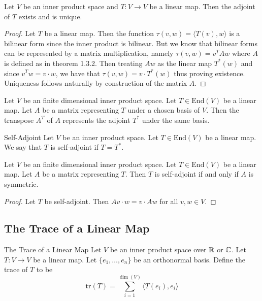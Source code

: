 \documentclass[a4paper]{article}
\begin{document}
\begin{prp}{}{} Let $V$ be an inner product space and $T:V\to V$ be a linear map. Then the adjoint of $T$ exists and is unique. 
\begin{proof}
Let $T$ be a linear map. Then the function $\tau(v,w)=\langle T(v), w\rangle$ is a bilinear form since the inner product is bilinear. But we know that bilinear forms can be represented by a matrix multiplication, namely $\tau(v,w)=v^TAw$ where $A$ is defined as in theorem 1.3.2. Then treating $Aw$ as the linear map $T^\ast(w)$ and since $v^Tw=v\cdot w$, we have that $\tau(v,w)=v\cdot T^\ast(w)$ thus proving existence. Uniqueness follows naturally by construction of the matrix $A$. 
\end{proof}
\end{prp}

\begin{prp}{}{} Let $V$ be an finite dimensional inner product space. Let $T\in\text{End}(V)$ be a linear map. Let $A$ be a matrix representing $T$ under a chosen basis of $V$. Then the transpose $A^T$ of $A$ represents the adjoint $T^\ast$ under the same basis. 
\end{prp}

\begin{defn}{Self-Adjoint}{} Let $V$ be an inner product space. Let $T\in\text{End}(V)$ be a linear map. We say that $T$ is self-adjoint if $T=T^\ast$. 
\end{defn}

\begin{prp}{}{} Let $V$ be an finite dimensional inner product space. Let $T\in\text{End}(V)$ be a linear map. Let $A$ be a matrix representing $T$. Then $T$ is self-adjoint if and only if $A$ is symmetric. 
\begin{proof}
Let $T$ be self-adjoint. Then $Av\cdot w=v\cdot Aw$ for all $v,w\in V$. 
\end{proof}
\end{prp}

\subsection{The Trace of a Linear Map}
\begin{defn}{The Trace of a Linear Map}{} Let $V$ be an inner product space over $\mathbb{R}$ or $\mathbb{C}$. Let $T:V\to V$ be a linear map. Let $\{e_1,\dots,e_n\}$ be an orthonormal basis. Define the trace of $T$ to be $$\text{tr}(T)=\sum_{i=1}^{\dim(V)}\langle T(e_i),e_i\rangle$$
\end{defn}
\end{document}

